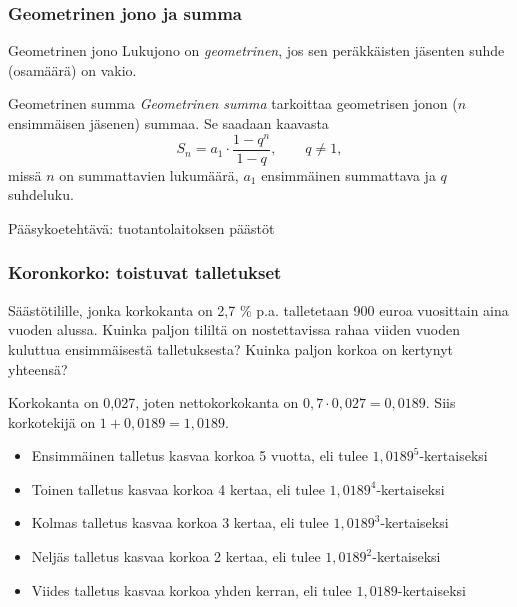 \documentclass[]{beamer}
\begin{document}
\begin{frame}
    \frametitle{Geometrinen jono ja summa}
    \pause
    \begin{block}{Geometrinen jono}
        Lukujono on \emph{geometrinen}, jos sen peräkkäisten jäsenten suhde (osamäärä) on vakio.
    \end{block}
    \pause
    \begin{block}{Geometrinen summa}
        \emph{Geometrinen summa} tarkoittaa geometrisen jonon ($n$ ensimmäisen jäsenen) summaa. Se saadaan kaavasta
        \[
            S_n = a_1\cdot \frac{1-q^n}{1-q}, \qquad q\neq 1,
        \] \pause
        missä \(n\) on summattavien lukumäärä,
        \pause \(a_1\) ensimmäinen summattava
        \pause ja \(q\) suhdeluku.
    \end{block}
\end{frame}

\begin{frame}
  \begin{esim}
    Pääsykoetehtävä: tuotantolaitoksen päästöt
  \end{esim}
\end{frame}

\begin{frame}
\frametitle{Koronkorko: toistuvat talletukset}
	\begin{esim}
		Säästötilille, jonka korkokanta on 2,7 \% p.a. talletetaan 900 euroa vuosittain aina vuoden alussa.
		Kuinka paljon tililtä on nostettavissa rahaa viiden vuoden kuluttua ensimmäisestä talletuksesta?
		Kuinka paljon korkoa on kertynyt yhteensä?
	\end{esim}
\end{frame}

\begin{frame}
	\begin{ratkaisu}
		\pause 
    Korkokanta on 0,027, joten nettokorkokanta on \(0,7\cdot0,027 = 0,0189\). \pause
		Siis korkotekijä on \(1+0,0189 =	1,0189\). \pause
		\begin{itemize}
		    \item Ensimmäinen talletus kasvaa korkoa 5 vuotta, eli tulee \(1,0189^5\)-kertaiseksi\pause
		    \item Toinen talletus kasvaa korkoa 4 kertaa, eli tulee \(1,0189^4\)-kertaiseksi\pause
		    \item Kolmas talletus kasvaa korkoa 3 kertaa, eli tulee \(1,0189^3\)-kertaiseksi\pause
		    \item Neljäs talletus kasvaa korkoa 2 kertaa, eli tulee \(1,0189^2\)-kertaiseksi\pause
		    \item Viides talletus kasvaa korkoa yhden kerran, eli tulee \(1,0189\)-kertaiseksi
		\end{itemize}
	\end{ratkaisu}
\end{frame}
\end{document}
